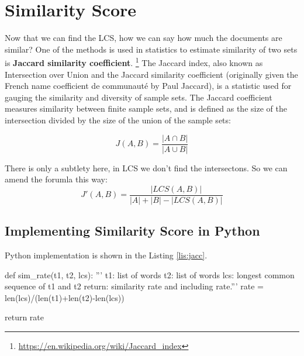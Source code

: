 \section{Similarity Score}
Now that we can find the LCS, how we can say how much the documents are similar?
One of the methods is used in statistics to estimate similarity of two sets is \textbf{Jaccard
similarity coefficient}.
\footnote{\href{https://en.wikipedia.org/wiki/Jaccard_index}{https://en.wikipedia.org/wiki/Jaccard_index}}
The Jaccard index, also known as Intersection over Union and 
the Jaccard similarity coefficient 
(originally given the French name coefficient de 
communauté by Paul Jaccard), is a statistic used for 
gauging the similarity and diversity of sample sets. 
The Jaccard coefficient measures similarity between finite 
sample sets, and is defined as the size of the intersection 
divided by the size of the union of the sample sets:

\begin{equation}
  \label{eq:jaccard}
  J(A,B) = \frac{|A\cap B|}{|A \cup B|}
\end{equation}

There is only a subtlety here, in LCS we don't find the intersectons.
So we can amend the forumla this way:
\begin{equation}
\label{eq:jacc2}
  J'(A,B) = \frac{|LCS(A,B)|}{|A|+ |B|-|LCS(A,B)| }
\end{equation}
\subsection{Implementing Similarity Score in Python}
Python implementation is shown in the Listing \ref{lis:jacc}.
\begin{python}[caption=jaccard similarity rate, label=lis:jacc]
def sim_rate(t1, t2, lcs):
    '''
    t1: list of words
    t2: list of words
    lcs: longest common sequence of t1 and t2
    return: similarity rate and including rate.'''
    rate = len(lcs)/(len(t1)+len(t2)-len(lcs))

    return rate
\end{python}

